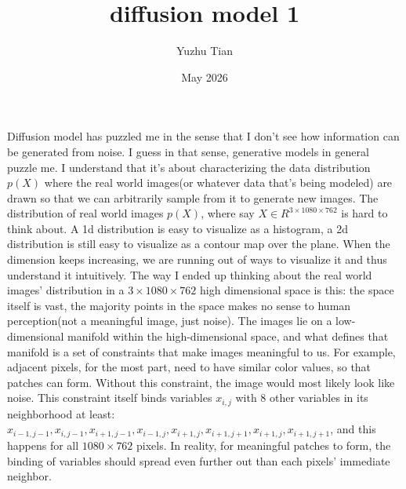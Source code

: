 \documentclass{article}
\title{diffusion model 1}
\author{Yuzhu Tian}
\date{May 2026}
\begin{document}
\maketitle
Diffusion model has puzzled me in the sense that I don't see how information can be generated from noise. I guess in that sense, generative models in general puzzle me. I understand that it's about characterizing the data distribution $p(X)$ where the real world images(or whatever data that's being modeled) are drawn so that we can arbitrarily sample from it to generate new images. The distribution of real world images $p(X)$, where say $X\in R^{3 \times 1080 \times 762}$ is hard to think about. A 1d distribution is easy to visualize as a histogram, a 2d distribution is still easy to visualize as a contour map over the plane. When the dimension keeps increasing, we are running out of ways to visualize it and thus understand it intuitively. The way I ended up thinking about the real world images' distribution in a $3 \times 1080 \times 762$ high dimensional space is this: the space itself is vast, the majority points in the space makes no sense to human perception(not a meaningful image, just noise). The images lie on a low-dimensional manifold within the high-dimensional space, and what defines that manifold is a set of constraints that make images meaningful to us. For example, adjacent pixels, for the most part, need to have similar color values, so that patches can form. Without this constraint, the image would most likely look like noise. This constraint itself binds variables $x_{i,j}$ with 8 other variables in its neighborhood at least: $x_{i-1,j-1}, x_{i,j-1}, x_{i+1,j-1}, x_{i-1,j},x_{i+1, j},x_{i+1,j+1},x_{i+1,j},x_{i+1,j+1}$, and this happens for all $1080 \times 762$ pixels. In reality, for meaningful patches to form, the binding of variables should spread even further out than each pixels' immediate neighbor.
\end{document}
